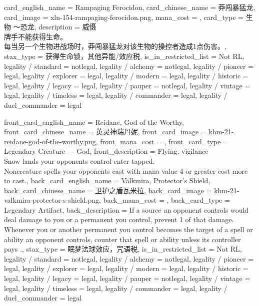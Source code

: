 \documentclass[lang = cn, color = black, 10pt]{AllThatStax}
\begin{document}
\card
{
	card_english_name = {Rampaging Ferocidon},
	card_chinese_name = {莽闯暴猛龙},
	card_image = xln-154-rampaging-ferocidon.png,
	mana_cost = ,
	card_type = 生物 ～恐龙,
	description = {威慑\\
		牌手不能获得生命。\\
		每当另一个生物进战场时，莽闯暴猛龙对该生物的操控者造成1点伤害。},
	stax_type = 获得生命锁，其他异能/效应税,
	is_in_restricted_list = Not RL,
	legality / standard = notlegal,
	legality / alchemy = notlegal,
	legality / pioneer = legal,
	legality / explorer = legal,
	legality / modern = legal,
	legality / historic = legal,
	legality / legacy = legal,
	legality / pauper = notlegal,
	legality / vintage = legal,
	legality / timeless = legal,
	legality / commander = legal,
	legality / duel_commander = legal
}

\mfcard
{
	front_card_english_name = {Reidane, God of the Worthy},
	front_card_chinese_name = {英灵神瑞丹妮},
	front_card_image = khm-21-reidane-god-of-the-worthy.png,
	front_mana_cost = ,
	front_card_type = Legendary Creature — God,
	front_description = {Flying, vigilance\\
		Snow lands your opponents control enter tapped.\\
		Noncreature spells your opponents cast with mana value 4 or greater cost  more to cast.},
	back_card_english_name = {Valkmira, Protector's Shield},
	back_card_chinese_name = {卫护之盾瓦米拉},
	back_card_image = khm-21-valkmira-protector-s-shield.png,
	back_mana_cost = ,
	back_card_type = Legendary Artifact,
	back_description = {If a source an opponent controls would deal damage to you or a permanent you control, prevent 1 of that damage.\\
		Whenever you or another permanent you control becomes the target of a spell or ability an opponent controls, counter that spell or ability unless its controller pays .},
	stax_type = 眠梦法球效应，咒语税,
	is_in_restricted_list = Not RL,
	legality / standard = notlegal,
	legality / alchemy = notlegal,
	legality / pioneer = legal,
	legality / explorer = legal,
	legality / modern = legal,
	legality / historic = legal,
	legality / legacy = legal,
	legality / pauper = notlegal,
	legality / vintage = legal,
	legality / timeless = legal,
	legality / commander = legal,
	legality / duel_commander = legal
}
\end{document}
